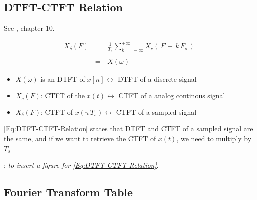 \newpage
\subsection{DTFT-CTFT Relation}


See \cite{signal_processing_Lathi}, chapter 10.

\begin{equation}
\begin{array}{lll}
X_{\delta}(F) \, &=& \, \displaystyle\frac{1}{T_s} \displaystyle\sum\limits_{k \, = \, -\infty}^{+ \infty} X_c \left(\, F \, - \, k \,F_s  \,\right) \\ \\
                &=& \, X(\omega)
\end{array}
\label{Eq:DTFT-CTFT-Relation}
\end{equation}

\begin{itemize}
    \item $X(\omega)$ is an DTFT of $x[n] \leftrightarrow$ DTFT of a discrete signal
    
    \item $X_c(F)$: CTFT of the $x(t) \leftrightarrow$ CTFT of a analog continous signal
    
    \item $X_{\delta}(F)$: CTFT of $x(n \, T_s) \leftrightarrow$ CTFT of a sampled signal 
    
\end{itemize}

\autoref{Eq:DTFT-CTFT-Relation} states that DTFT and CTFT of a sampled signal are the same, and if we want to retrieve the CTFT of $x(t)$, we need to multiply by $T_s$

: \textit{to insert a figure for \autoref{Eq:DTFT-CTFT-Relation}}.


\subsection{Fourier Transform Table}

